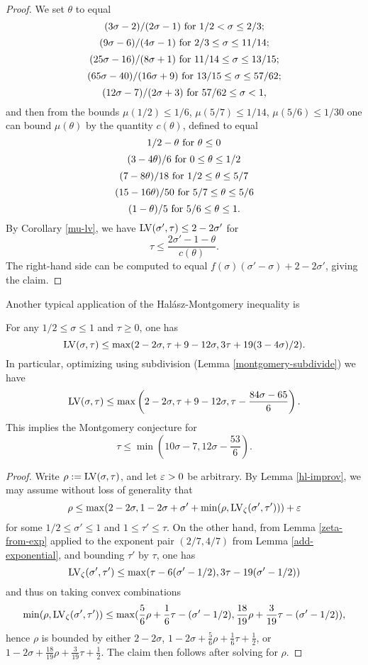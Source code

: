 \begin{proof} We set $\theta$ to equal
$$ (3\sigma-2)/(2\sigma-1) \hbox{ for } 1/2 < \sigma \leq 2/3;$$
$$ (9\sigma-6)/(4\sigma-1) \hbox{ for } 2/3 \leq \sigma \leq 11/14;$$
$$ (25\sigma-16)/(8\sigma+1) \hbox{ for } 11/14 \leq \sigma \leq 13/15;$$
$$ (65\sigma-40)/(16\sigma+9) \hbox{ for } 13/15 \leq \sigma \leq 57/62;$$
$$ (12\sigma-7)/(2\sigma+3) \hbox{ for } 57/62 \leq \sigma < 1,$$
and then from the bounds $\mu(1/2) \leq 1/6$, $\mu(5/7) \leq 1/14$, $\mu(5/6) \leq 1/30$ one can bound $\mu(\theta)$ by the quantity $c(\theta)$, defined to equal
$$ 1/2 - \theta \hbox{ for } \theta \leq 0$$
$$ (3-4\theta)/6 \hbox{ for } 0 \leq \theta \leq 1/2$$
$$ (7-8\theta)/18 \hbox{ for } 1/2 \leq \theta \leq 5/7$$
$$ (15-16\theta)/50 \hbox{ for } 5/7 \leq \theta \leq 5/6$$
$$ (1-\theta)/5 \hbox{ for } 5/6 \leq \theta \leq 1.$$
By Corollary \ref{mu-lv}, we have $\mathrm{LV}(\sigma',\tau) \leq 2-2\sigma'$ for
$$ \tau \leq \frac{2\sigma'-1-\theta}{c(\theta)}.$$
The right-hand side can be computed to equal $f(\sigma)(\sigma'-\sigma) + 2 - 2\sigma'$, giving the claim.
\end{proof}

Another typical application of the Hal\'asz-Montgomery inequality is

\begin{lemma}\label{ivic-lvt}\cite[(11.40)]{ivic}  For any $1/2 \leq \sigma \leq 1$ and $\tau \geq 0$, one has
    $$ \mathrm{LV}(\sigma,\tau) \leq \max( 2-2\sigma, \tau + 9-12\sigma, 3\tau + 19(3-4\sigma)/2).$$
    In particular, optimizing using subdivision (Lemma \ref{montgomery-subdivide}) we have
    $$ \mathrm{LV}(\sigma,\tau) \leq \max\left( 2-2\sigma, \tau + 9-12\sigma, \tau - \frac{84\sigma-65}{6}\right).$$
    This implies the Montgomery conjecture for
    $$ \tau \leq \min\left( 10\sigma-7, 12 \sigma - \frac{53}{6}\right).$$
\end{lemma}

\begin{proof}  Write $\rho := \mathrm{LV}(\sigma,\tau)$, and let $\varepsilon>0$ be arbitrary. By Lemma \ref{hl-improv}, we may assume without loss of generality that
    $$ \rho \leq \max( 2-2\sigma, 1-2\sigma + \sigma' + \min( \rho, \mathrm{LV}_\zeta(\sigma',\tau')) ) + \varepsilon$$
    for some $1/2 \leq \sigma' \leq 1$ and $1 \leq \tau' \leq \tau$.  On the other hand, from Lemma \ref{zeta-from-exp} applied to the exponent pair $(2/7,4/7)$ from Lemma \ref{add-exponential}, and bounding $\tau'$ by $\tau$, one has
    $$ \mathrm{LV}_\zeta(\sigma',\tau') \leq \max( \tau-6(\sigma'-1/2), 3\tau - 19(\sigma'-1/2))$$
    and thus on taking convex combinations
    $$ \min(\rho,\mathrm{LV}_\zeta(\sigma',\tau')) \leq \max( \frac{5}{6}\rho + \frac{1}{6} \tau - (\sigma'-1/2), \frac{18}{19} \rho + \frac{3}{19} \tau - (\sigma'-1/2) ),$$
    hence $\rho$ is bounded by either $2 - 2 \sigma$, $1 - 2\sigma + \frac{5}{6}\rho + \frac{1}{6} \tau + \frac{1}{2}$, or $1-2\sigma + \frac{18}{19} \rho + \frac{3}{19} \tau + \frac{1}{2}$.  The claim then follows after solving for $\rho$.
\end{proof}
